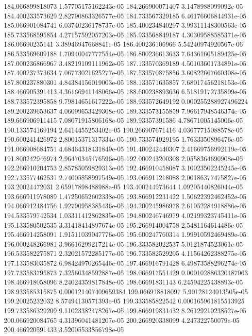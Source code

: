 {184.066899818073 1.57705175162243e-05
184.266900071407 3.1478988099092e-05
184.400233573629 2.82790863326577e-05
184.733567329185 6.46176606844931e-05
185.066901084741 6.03740236178737e-05
185.400234840297 3.99311148300563e-05
185.733568595854 4.27157592057203e-05
185.933568849187 4.30309588585371e-05
186.06690235141 3.38946947668841e-05
186.400236106966 5.54240974920567e-06
186.533569609188 1.70940047777554e-05
186.800236613633 7.64361605189425e-05
187.000236866967 3.48219109111962e-05
187.133570369189 4.50103601734891e-05
187.400237373634 7.06773021625277e-05
187.533570875856 3.60822667660308e-05
187.800237880301 4.84384156019003e-05
188.133571635857 7.68017456218153e-05
188.466905391413 4.36166941148066e-05
188.600238893636 6.51819172735809e-05
188.733572395858 9.79814651617222e-05
188.933572649192 0.000255288927496224
189.200239653637 4.06099653429308e-05
189.333573155859 7.96617948546374e-05
189.666906911415 7.08071915806168e-05
189.93357391586 4.78671005145006e-05
190.133574169194 2.6414455253402e-05
190.266907671416 4.03677715088578e-05
190.600241426972 2.80015371317334e-05
190.733574929195 1.7633350896476e-05
191.066908684751 4.68464318431849e-05
191.400242440307 2.41669756992119e-05
191.800242946974 2.96470345476596e-05
192.000243200308 2.0558364690908e-05
192.266910204753 2.85785059829313e-05
192.466910458087 3.10023502245245e-05
192.733577462531 2.74005858997549e-05
193.066911218088 2.00186377475827e-05
193.20024472031 2.65917898488988e-05
193.400244973644 1.09205440826044e-05
193.666911978089 1.47250652602338e-05
193.866912231422 1.50622392462452e-05
194.066912484756 1.92790958385436e-05
194.200245986978 2.61052284918886e-05
194.533579742534 1.03311412862835e-05
194.800246746979 4.02199323745411e-05
195.133580502535 3.31418414897674e-05
195.266914004758 2.5481164614486e-05
195.466914258091 1.91511039047776e-05
195.600247760314 1.99910592469489e-05
196.000248266981 3.96616299217214e-05
196.333582022537 5.0121874523061e-05
196.533582275871 2.32021572285177e-05
196.733582529205 4.11564262388275e-05
197.133583035872 6.98424970265446e-05
197.466916791428 6.49873588296274e-05
197.733583795873 7.32560348592887e-05
198.066917551429 0.000102886320487063
198.466918058096 8.24024359817848e-05
198.66691831143 6.24594225438893e-05
198.933585315875 0.000121407409659384
199.066918818097 5.90128124013505e-05
199.20025232032 8.57494130571393e-05
199.333585822542 0.000165961815513925
199.733586329209 9.11023382478267e-05
199.866919831432 8.26129210238527e-05
200.066920084765 4.31396041481207e-05
200.266920338099 4.247322750079e-05
200.466920591433 3.52005533856798e-05
}
